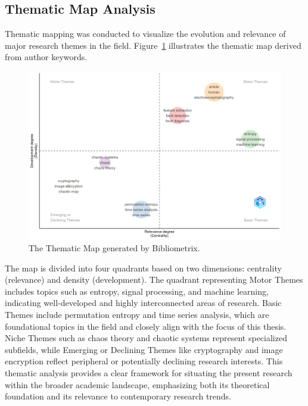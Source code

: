 \subsection{Thematic Map Analysis}

Thematic mapping was conducted to visualize the evolution and relevance of major research themes in the field. 
Figure~\ref{fig:ThematicMap} illustrates the thematic map derived from author keywords.

\begin{figure}[H]
	\centering
	\includegraphics[width=\textwidth]{ThematicMap}
	\caption{The Thematic Map generated by Bibliometrix.}
	\label{fig:ThematicMap}
\end{figure}

The map is divided into four quadrants based on two dimensions: centrality (relevance) and density (development). 
The quadrant representing Motor Themes includes topics such as entropy, signal processing, and machine learning, indicating well-developed and highly interconnected areas of research. %
Basic Themes include permutation entropy and time series analysis, which are foundational topics in the field and closely align with the focus of this thesis. %
Niche Themes such as chaos theory and chaotic systems represent specialized subfields, while Emerging or Declining Themes like cryptography and image encryption reflect peripheral or potentially declining research interests. 
This thematic analysis provides a clear framework for situating the present research within the broader academic landscape, emphasizing both its theoretical foundation and its relevance to contemporary research trends.

